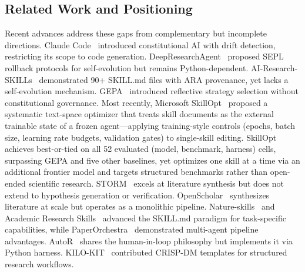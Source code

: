 \documentclass[review]{elsarticle}
\begin{document}
\subsection{Related Work and Positioning}
\label{sec:related}

Recent advances address these gaps from complementary but incomplete directions. Claude Code~\cite{anthropic2025claude} introduced constitutional AI with drift detection, restricting its scope to code generation. DeepResearchAgent~\cite{skyworkai2026deep} proposed SEPL rollback protocols for self-evolution but remains Python-dependent. AI-Research-SKILLs~\cite{orchestra2026airesearch} demonstrated 90+ SKILL.md files with ARA provenance, yet lacks a self-evolution mechanism. GEPA~\cite{gepa2025gepa} introduced reflective strategy selection without constitutional governance. Most recently, Microsoft SkillOpt~\cite{yang2026skillopt} proposed a systematic text-space optimizer that treats skill documents as the external trainable state of a frozen agent---applying training-style controls (epochs, batch size, learning rate budgets, validation gates) to single-skill editing. SkillOpt achieves best-or-tied on all 52 evaluated (model, benchmark, harness) cells, surpassing GEPA and five other baselines, yet optimizes one skill at a time via an additional frontier model and targets structured benchmarks rather than open-ended scientific research. STORM~\cite{shao2024storm} excels at literature synthesis but does not extend to hypothesis generation or verification. OpenScholar~\cite{asai2025openscholar} synthesizes literature at scale but operates as a monolithic pipeline. Nature-skills~\cite{yuan2025nature} and Academic Research Skills~\cite{ars2025academic} advanced the SKILL.md paradigm for task-specific capabilities, while PaperOrchestra~\cite{song2026paperorchestra} demonstrated multi-agent pipeline advantages. AutoR~\cite{autox2025autor} shares the human-in-loop philosophy but implements it via Python harness. KILO-KIT~\cite{vo2025kilo} contributed CRISP-DM templates for structured research workflows.
\end{document}
